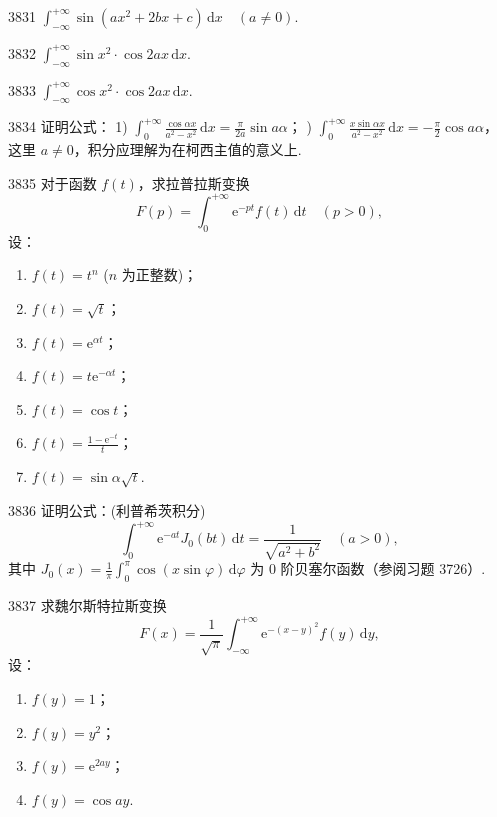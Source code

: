 \begin{prob}[S]{3831}
$\displaystyle \int_{-\infty}^{+\infty} \sin(ax^2+2bx+c) \,\mathrm{d}x \quad (a\neq 0)$.
\end{prob}

\begin{prob}[S]{3832}
$\displaystyle \int_{-\infty}^{+\infty} \sin x^2 \cdot \cos 2ax \,\mathrm{d}x$.
\end{prob}

\begin{prob}[S]{3833}
$\displaystyle \int_{-\infty}^{+\infty} \cos x^2 \cdot \cos 2ax \,\mathrm{d}x$.
\end{prob}

\begin{prob}[M]{3834}
证明公式：
1) $\displaystyle \int_0^{+\infty} \frac{\cos\alpha x}{a^2-x^2} \,\mathrm{d}x = \frac{\pi}{2a}\sin a\alpha$； ) $\displaystyle \int_0^{+\infty} \frac{x\sin\alpha x}{a^2-x^2} \,\mathrm{d}x = -\frac{\pi}{2}\cos a\alpha$，
这里 $a\neq 0$，积分应理解为在柯西主值的意义上.
\end{prob}

\begin{prob}[L]{3835}
对于函数 $f(t)$，求拉普拉斯变换
\[
F(p) = \int_0^{+\infty} \mathrm{e}^{-pt} f(t) \,\mathrm{d}t \quad (p>0),
\]
设：
\begin{enumerate}[label=(\alph*), itemsep=2pt, topsep=3pt]
\item $f(t) = t^n$ ($n$ 为正整数)；
\item $f(t) = \sqrt{t}$；
\item $f(t) = \mathrm{e}^{\alpha t}$；
\item $f(t) = t\mathrm{e}^{-\alpha t}$；
\item $f(t) = \cos t$；
\item $\displaystyle f(t) = \frac{1-\mathrm{e}^{-t}}{t}$；
\item $f(t) = \sin\alpha\sqrt{t}$.
\end{enumerate}
\end{prob}

\begin{prob}[M]{3836}
证明公式：(利普希茨积分)
\[
\int_0^{+\infty} \mathrm{e}^{-at} J_0(bt) \,\mathrm{d}t = \frac{1}{\sqrt{a^2+b^2}} \quad (a>0),
\]
其中 $J_0(x) = \frac{1}{\pi} \int_0^{\pi} \cos(x\sin\varphi) \,\mathrm{d}\varphi$ 为 $0$ 阶贝塞尔函数（参阅习题 3726）.
\end{prob}

\begin{prob}[L]{3837}
求魏尔斯特拉斯变换
\[
F(x) = \frac{1}{\sqrt{\pi}} \int_{-\infty}^{+\infty} \mathrm{e}^{-(x-y)^2} f(y) \,\mathrm{d}y,
\]
设：
\begin{enumerate}[label=(\alph*), itemsep=2pt, topsep=3pt]
\item $f(y) = 1$；
\item $f(y) = y^2$；
\item $f(y) = \mathrm{e}^{2ay}$；
\item $f(y) = \cos ay$.
\end{enumerate}
\end{prob}


